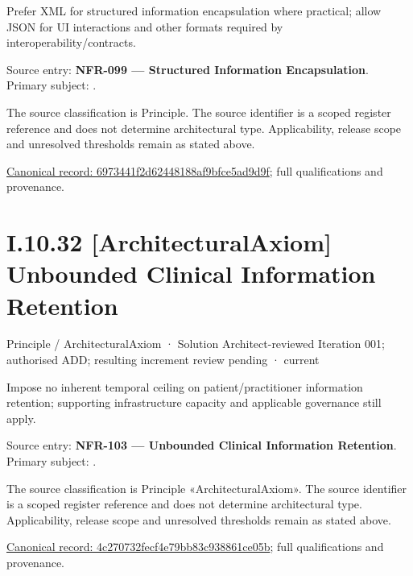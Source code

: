 Prefer XML for structured information encapsulation where practical; allow JSON for UI interactions and other formats required by interoperability/contracts.



Source entry: \textbf{NFR-099 — Structured Information Encapsulation}. Primary subject: \texttt{}.



The source classification is Principle. The source identifier is a scoped register reference and does not determine architectural type. Applicability, release scope and unresolved thresholds remain as stated above.


{\footnotesize \href{../../../../continuum/motivation/principle/6973441f2d62448188af9bfce5ad9d9f.md}{Canonical record: 6973441f2d62448188af9bfce5ad9d9f}; full qualifications and provenance.}\par
\section*{I.10.32 [ArchitecturalAxiom] Unbounded Clinical Information Retention}
\label{navigation:I.10.32}

\label{element:4c270732fecf4e79bb83c938861ce05b}
{\small Principle / ArchitecturalAxiom · Solution Architect-reviewed Iteration 001; authorised ADD; resulting increment review pending · current}\par

Impose no inherent temporal ceiling on patient/practitioner information retention; supporting infrastructure capacity and applicable governance still apply.



Source entry: \textbf{NFR-103 — Unbounded Clinical Information Retention}. Primary subject: \texttt{}.



The source classification is Principle «ArchitecturalAxiom». The source identifier is a scoped register reference and does not determine architectural type. Applicability, release scope and unresolved thresholds remain as stated above.


{\footnotesize \href{../../../../continuum/motivation/principle/architectural-axiom/4c270732fecf4e79bb83c938861ce05b.md}{Canonical record: 4c270732fecf4e79bb83c938861ce05b}; full qualifications and provenance.}\par
